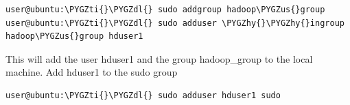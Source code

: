 \documentclass[letterpaper,10pt,english]{sphinxmanual}
\def\PYGZus{\char`\_}
\def\PYGZdl{\char`\$}
\def\PYGZhy{\char`\-}
\def\PYGZti{\char`\~}
\begin{document}
\begin{Verbatim}[commandchars=\\\{\}]
user@ubuntu:\PYGZti{}\PYGZdl{} sudo addgroup hadoop\PYGZus{}group
user@ubuntu:\PYGZti{}\PYGZdl{} sudo adduser \PYGZhy{}\PYGZhy{}ingroup hadoop\PYGZus{}group hduser1
\end{Verbatim}
\begin{figure}[htbp]
\centering

\end{figure}
\begin{figure}[htbp]
\centering

\end{figure}

This will add the user hduser1 and the group hadoop\_group to the local machine.
Add hduser1 to the sudo group

\begin{Verbatim}[commandchars=\\\{\}]
user@ubuntu:\PYGZti{}\PYGZdl{} sudo adduser hduser1 sudo
\end{Verbatim}
\end{document}

